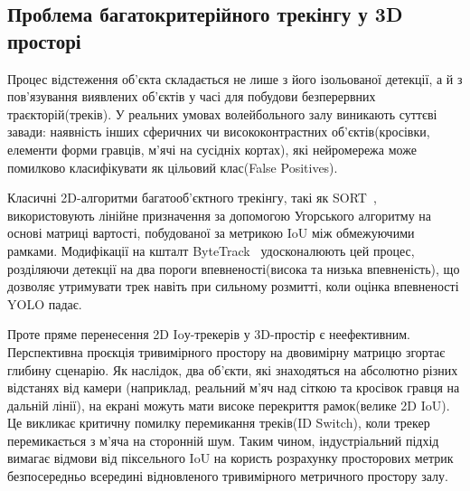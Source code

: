 \subsection{Проблема багатокритерійного трекінгу у 3D просторі}

Процес відстеження об'єкта складається не лише з його ізольованої
детекції, а й з пов'язування виявлених об'єктів у часі для побудови
безперервних траєкторій(треків). У реальних умовах волейбольного залу
виникають суттєві завади: наявність інших сферичних чи висококонтрастних
об'єктів(кросівки, елементи форми гравців, м'ячі на сусідніх кортах), які
нейромережа може помилково класифікувати як цільовий клас(False
Positives).

Класичні 2D-алгоритми багатооб'єктного трекінгу, такі як \gls{SORT}~\cite{bewley_sort}, використовують лінійне призначення за
допомогою Угорського алгоритму на основі матриці вартості, побудованої за
метрикою \gls{IoU} між обмежуючими рамками.
Модифікації на кшталт ByteTrack~\cite{zhang_bytetrack} удосконалюють цей процес, розділяючи
детекції на два пороги впевненості(висока та низька впевненість), що дозволяє
утримувати трек навіть при сильному розмитті, коли оцінка
впевненості \gls{YOLO} падає.

Проте пряме перенесення 2D Ioу-трекерів у 3D-простір є
неефективним. Перспективна проєкція тривимірного простору на двовимірну
матрицю згортає глибину сценарію. Як наслідок, два об'єкти, які знаходяться
на абсолютно різних відстанях від камери (наприклад, реальний м'яч над
сіткою та кросівок гравця на дальній лінії), на екрані можуть мати високе
перекриття рамок(велике 2D \gls{IoU}). Це викликає критичну помилку
перемикання треків(ID Switch), коли трекер перемикається з м'яча на
сторонній шум. Таким чином, індустріальний підхід вимагає відмови від
піксельного \gls{IoU} на користь розрахунку просторових метрик безпосередньо
всередині відновленого тривимірного метричного простору залу.

